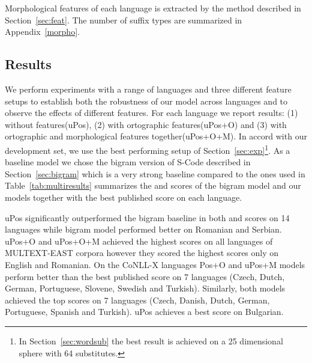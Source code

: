 Morphological features of each language is extracted by the method
described in Section~\ref{sec:feat}.  The number of suffix types are
summarized in Appendix~\ref{morpho}.

\subsection{Results}

We perform experiments with a range of languages and three different
feature setups to establish both the robustness of our model across
languages and to observe the effects of different features.  For each
language we report results: (1) without features(uPos), (2) with
ortographic features(uPos+O) and (3) with ortographic and
morphological features together(uPos+O+M).  In accord with our
development set, we use the best performing setup of
Section~\ref{sec:exp}\footnote{In Section~\ref{sec:wordsub} the best
  result is achieved on a 25 dimensional sphere with 64 substitutes.}.
As a baseline model we chose the bigram version of S-Code described in
Section~\ref{sec:bigram} which is a very strong baseline compared to
the ones used in \cite{christodoulopoulos-goldwater-steedman:2011:EMNLP}
Table~\ref{tab:multiresults} summarizes the \mto and \vm scores of the
bigram model and our models together with the best published score on
each language.

uPos significantly outperformed the bigram baseline in both \mto and
\vm scores on 14 languages while bigram model performed better on
Romanian and Serbian.  uPos+O and uPos+O+M achieved the highest \mto
scores on all languages of MULTEXT-EAST corpora however they scored
the highest \vm scores only on English and Romanian.  On the CoNLL-X
languages Pos+O and uPos+M models perform better than the best
published \mto score on 7 languages (Czech, Dutch, German, Portuguese,
Slovene, Swedish and Turkish).  Similarly, both models achieved the
top \vm scores on 7 languages (Czech, Danish, Dutch, German,
Portuguese, Spanish and Turkish).  uPos achieves a best \mto score on
Bulgarian.

